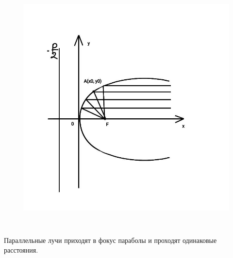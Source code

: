 \begin{figure}
    \includegraphics[width=1.0\linewidth]{images/парабола2.jpeg}
\end{figure}

\tab\\
\begin{theorem}
    Параллельные лучи приходят в фокус параболы и проходят одинаковые расстояния.
\end{theorem}
